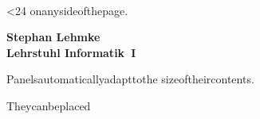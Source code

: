 
  \mklength{\slideleftmargin}{\leftpanelwidth*\ratio{1cm}{\semcm}+.5cm}
  \setlength{\slidewidth}{\paperwidth-\slideleftmargin-\sliderightmargin}

  \begin{slide}
  \end{slide}

\repeat
\endgroup

\setcounter{i}{0}

\setlength{\buttonwidth}{1.5cm}

{%
  \leavevmode\scriptsize\smash{\usebox{\hookbox}}\hfill%
  ~%
  ~%
  ~%
}

\mklength{\slidebottommargin}{\bottompanelheight*\ratio{1cm}{\semcm}+.5cm}

\begingroup
\loop
 \ifnum\value{i}<24
  \storehead{\partialtext}{\value{i}}
  {%
    on\space any\space side\space of\space the\space page.
  }%
  {%
    \leavevmode\scriptsize\parskip0pt\relax
    \mbox{\usebox{\logobox}}

    \medskip

    \parbox[t]{\widthof{\bfseries Lehrstuhl Informatik~I}}
    {\bfseries Stephan Lehmke\\ Lehrstuhl Informatik~I}\quad
    \parbox[t]{\linewidth-\widthof{\bfseries Lehrstuhl Informatik~I}-3cm}
    {%
      Panels\space automatically\space adapt\space to\space the\space
      size\space of\space their\space contents.\par
      They\space can\space be\space placed
      \partialtext
    }
  }%


  \mklength{\slidetopmargin}{\toppanelheight*\ratio{1cm}{\semcm}+.5cm}
  \setlength{\slideheight}{\paperheight-\slidetopmargin-\slidebottommargin}

  \begin{slide}
    \small{}
  \end{slide}

\repeat
\endgroup

\setlength{\slideheight}{\paperheight-\slidetopmargin-\slidebottommargin}


